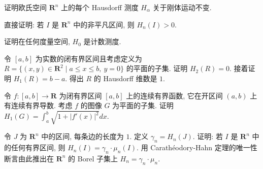 \documentclass[../../main.tex]{subfiles}
\begin{document}
\begin{exercise}\label{exercise:ch20-50}
证明欧氏空间 $\mathbf{R}^{n}$ 上的每个 Hausdorff 测度 $H_{\alpha}$ 关于刚体运动不变.
\end{exercise}

\begin{exercise}\label{exercise:ch20-51}
直接证明: 若 $I$ 是 $\mathbf{R}^{n}$ 中的非平凡区间, 则 $H_{n}(I)>0$.
\end{exercise}

\begin{exercise}\label{exercise:ch20-52}
证明在任何度量空间, $H_{0}$ 是计数测度.
\end{exercise}

\begin{exercise}\label{exercise:ch20-53}
令 $[a,b]$ 为实数的闭有界区间且考虑定义为 $R=\{(x,y)\in\mathbf{R}^{2}\mid a\leqslant x\leqslant b,\ y=0\}$ 的平面的子集. 证明 $H_{2}(R)=0$. 接着证明 $H_{1}(R)=b-a$. 得出 $R$ 的 Hausdorff 维数是 $1$.
\end{exercise}

\begin{exercise}\label{exercise:ch20-54}
令 $f:[a,b]\to\mathbf{R}$ 为闭有界区间 $[a,b]$ 上的连续有界函数, 它在开区间 $(a,b)$ 上有连续有界导数. 考虑 $f$ 的图像 $G$ 为平面的子集. 证明 $H_{1}(G)=\int_{a}^{b}\sqrt{1+|f'(x)|^{2}}dx$.
\end{exercise}

\begin{exercise}\label{exercise:ch20-55}
令 $J$ 为 $\mathbf{R}^{n}$ 中的区间, 每条边的长度为 $1$. 定义 $\gamma_{n}=H_{n}(J)$. 证明: 若 $I$ 是 $\mathbf{R}^{n}$ 中的任何有界区间, 则 $H_{n}(I)=\gamma_{n}\cdot\mu_{n}(I)$. 用 Carath\'eodory-Hahn 定理的唯一性断言由此推出在 $\mathbf{R}^{n}$ 的 Borel 子集上 $H_{n}=\gamma_{n}\cdot\mu_{n}$.
\end{exercise}
\end{document}
